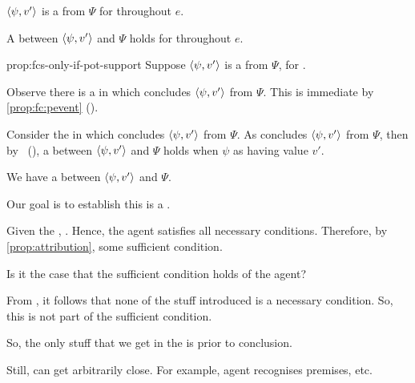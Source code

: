 \begin{note}
    \begin{proposition}
    \label{prop:fcs-only-if-pot-support}
    \vspace{-\baselineskip}
    \begin{itenum}
    \item[\emph{If}:]
      \(\langle \psi, v' \rangle\) is a  from \(\Psi\) for \vAgent{} throughout \(e\).
    \item[\emph{Then}:]
      A  between \(\langle \psi, v' \rangle\) and \(\Psi\) holds for \vAgent{} throughout \(e\).
    \end{itenum}
    \vspace{-\baselineskip}
  \end{proposition}

  \begin{argument}{prop:fcs-only-if-pot-support}
    Suppose \(\langle \psi, v' \rangle\) is a  from \(\Psi\), for \vAgent{}.

    \smallskip
    Observe there is a \pevent{} in which \vAgent{} concludes \(\langle \psi, v' \rangle\) from \(\Psi\).
    This is immediate by \autoref{prop:fc:pevent} ().

    \smallskip
    Consider the \pevent{} in which \vAgent{} concludes \(\langle \psi, v' \rangle\) from \(\Psi\).
    As \vAgent{} concludes \(\langle \psi, v' \rangle\) from \(\Psi\), then by~\supportI{} (\supportIpage{}), a \ros{} between \(\langle \psi, v' \rangle\) and \(\Psi\) holds when \vAgent{}  \(\psi\) as having value \(v'\).

    We have a \potential{} \ros{} between \(\langle \psi, v' \rangle\) and \(\Psi\).

    Our goal is to establish this \potential{} \ros{} is a \ros{}.

    \smallskip
    Given the \pevent{}, \ros{}.
    Hence, the agent satisfies all necessary conditions.
    Therefore, by \autoref{prop:attribution}, some sufficient condition.

    Is it the case that the sufficient condition holds of the agent?

    \smallskip
    From \supportII{}, it follows that none of the stuff introduced is a necessary condition.
    So, this is not part of the sufficient condition.

    So, the only stuff that we get in the \pevent{} is prior to conclusion.


    Still, can get arbitrarily close.
    For example, agent recognises premises, etc.


\end{argument}
\end{note}
